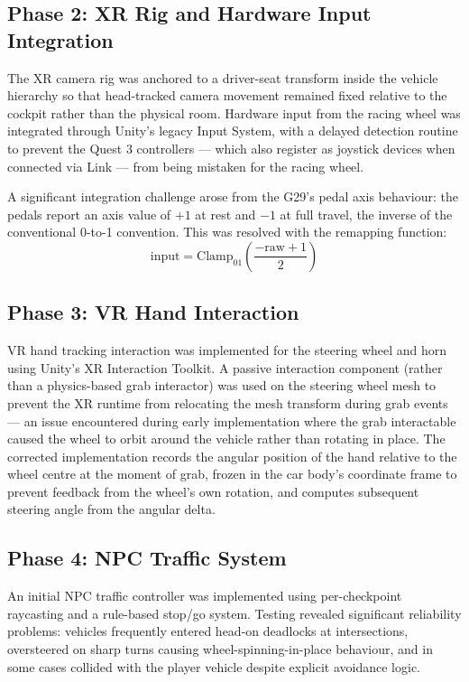 \subsection{Phase 2: XR Rig and Hardware Input Integration}
The XR camera rig was anchored to a driver-seat transform inside the vehicle hierarchy so that head-tracked camera movement remained fixed relative to the cockpit rather than the physical room. Hardware input from the racing wheel was integrated through Unity's legacy Input System, with a delayed detection routine to prevent the Quest 3 controllers — which also register as joystick devices when connected via Link — from being mistaken for the racing wheel.

A significant integration challenge arose from the G29's pedal axis behaviour: the pedals report an axis value of $+1$ at rest and $-1$ at full travel, the inverse of the conventional 0-to-1 convention. This was resolved with the remapping function:
\[
\text{input} = \text{Clamp}_{01}\!\left(\frac{-\text{raw}+1}{2}\right)
\]

\subsection{Phase 3: VR Hand Interaction}
VR hand tracking interaction was implemented for the steering wheel and horn using Unity's XR Interaction Toolkit. A passive interaction component (rather than a physics-based grab interactor) was used on the steering wheel mesh to prevent the XR runtime from relocating the mesh transform during grab events — an issue encountered during early implementation where the grab interactable caused the wheel to orbit around the vehicle rather than rotating in place. The corrected implementation records the angular position of the hand relative to the wheel centre at the moment of grab, frozen in the car body's coordinate frame to prevent feedback from the wheel's own rotation, and computes subsequent steering angle from the angular delta.

\subsection{Phase 4: NPC Traffic System}
An initial NPC traffic controller was implemented using per-checkpoint raycasting and a rule-based stop/go system. Testing revealed significant reliability problems: vehicles frequently entered head-on deadlocks at intersections, oversteered on sharp turns causing wheel-spinning-in-place behaviour, and in some cases collided with the player vehicle despite explicit avoidance logic. 

